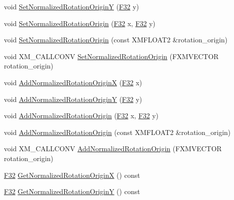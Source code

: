 \begin{DoxyCompactItemize}
\item 
void \hyperlink{structmage_1_1_sprite_transform_ab940629ca5a67e28fa470800bcef705d}{Set\+Normalized\+Rotation\+OriginY} (\hyperlink{namespacemage_aa97e833b45f06d60a0a9c4fc22ae02c0}{F32} y)
\item 
void \hyperlink{structmage_1_1_sprite_transform_aeab79024ac1941d9865a202258238dfe}{Set\+Normalized\+Rotation\+Origin} (\hyperlink{namespacemage_aa97e833b45f06d60a0a9c4fc22ae02c0}{F32} x, \hyperlink{namespacemage_aa97e833b45f06d60a0a9c4fc22ae02c0}{F32} y)
\item 
void \hyperlink{structmage_1_1_sprite_transform_a8cb44224f42f9b7811b39427c2745b3f}{Set\+Normalized\+Rotation\+Origin} (const X\+M\+F\+L\+O\+A\+T2 \&rotation\+\_\+origin)
\item 
void X\+M\+\_\+\+C\+A\+L\+L\+C\+O\+NV \hyperlink{structmage_1_1_sprite_transform_a820e4d9bcfaf0a66b325c5229c06de78}{Set\+Normalized\+Rotation\+Origin} (F\+X\+M\+V\+E\+C\+T\+OR rotation\+\_\+origin)
\item 
void \hyperlink{structmage_1_1_sprite_transform_a005c488bb8601f0defe11b3496a4a838}{Add\+Normalized\+Rotation\+OriginX} (\hyperlink{namespacemage_aa97e833b45f06d60a0a9c4fc22ae02c0}{F32} x)
\item 
void \hyperlink{structmage_1_1_sprite_transform_a322c799c3cc72ac44dbc1a2ed1234a67}{Add\+Normalized\+Rotation\+OriginY} (\hyperlink{namespacemage_aa97e833b45f06d60a0a9c4fc22ae02c0}{F32} y)
\item 
void \hyperlink{structmage_1_1_sprite_transform_af5b99182b93907b946df86a30bdf9e9b}{Add\+Normalized\+Rotation\+Origin} (\hyperlink{namespacemage_aa97e833b45f06d60a0a9c4fc22ae02c0}{F32} x, \hyperlink{namespacemage_aa97e833b45f06d60a0a9c4fc22ae02c0}{F32} y)
\item 
void \hyperlink{structmage_1_1_sprite_transform_a40a99b8114f448717ce1f7c7644ea6ee}{Add\+Normalized\+Rotation\+Origin} (const X\+M\+F\+L\+O\+A\+T2 \&rotation\+\_\+origin)
\item 
void X\+M\+\_\+\+C\+A\+L\+L\+C\+O\+NV \hyperlink{structmage_1_1_sprite_transform_a5571cc3e5700aba23f8c229675f10c3e}{Add\+Normalized\+Rotation\+Origin} (F\+X\+M\+V\+E\+C\+T\+OR rotation\+\_\+origin)
\item 
\hyperlink{namespacemage_aa97e833b45f06d60a0a9c4fc22ae02c0}{F32} \hyperlink{structmage_1_1_sprite_transform_a44a0577d7c136650027da9f5b8a6be77}{Get\+Normalized\+Rotation\+OriginX} () const
\item 
\hyperlink{namespacemage_aa97e833b45f06d60a0a9c4fc22ae02c0}{F32} \hyperlink{structmage_1_1_sprite_transform_afc002a5d0357c2dc638cc166904446d1}{Get\+Normalized\+Rotation\+OriginY} () const

\end{DoxyCompactItemize}
